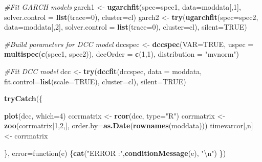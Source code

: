 \documentclass[]{elsarticle} %
\newenvironment{Shaded}{\begin{snugshade}}{\end{snugshade}}
\newcommand{\KeywordTok}[1]{\textcolor[rgb]{0.13,0.29,0.53}{\textbf{{#1}}}}
\newcommand{\DataTypeTok}[1]{\textcolor[rgb]{0.13,0.29,0.53}{{#1}}}
\newcommand{\DecValTok}[1]{\textcolor[rgb]{0.00,0.00,0.81}{{#1}}}
\newcommand{\CharTok}[1]{\textcolor[rgb]{0.31,0.60,0.02}{{#1}}}
\newcommand{\StringTok}[1]{\textcolor[rgb]{0.31,0.60,0.02}{{#1}}}
\newcommand{\CommentTok}[1]{\textcolor[rgb]{0.56,0.35,0.01}{\textit{{#1}}}}
\newcommand{\OtherTok}[1]{\textcolor[rgb]{0.56,0.35,0.01}{{#1}}}
\newcommand{\NormalTok}[1]{{#1}}
\begin{document}
\begin{Shaded}
\begin{Highlighting}[]
        \CommentTok{#Fit GARCH models}
        \NormalTok{garch1 <-}\StringTok{ }\KeywordTok{ugarchfit}\NormalTok{(}\DataTypeTok{spec=}\NormalTok{spec1, }\DataTypeTok{data=}\NormalTok{moddata[,}\DecValTok{1}\NormalTok{], }\DataTypeTok{solver.control =} \KeywordTok{list}\NormalTok{(}\DataTypeTok{trace=}\DecValTok{0}\NormalTok{), }
                            \DataTypeTok{cluster=}\NormalTok{cl)}
        \NormalTok{garch2 <-}\StringTok{ }\KeywordTok{try}\NormalTok{(}\KeywordTok{ugarchfit}\NormalTok{(}\DataTypeTok{spec=}\NormalTok{spec2, }\DataTypeTok{data=}\NormalTok{moddata[,}\DecValTok{2}\NormalTok{], }\DataTypeTok{solver.control =} \KeywordTok{list}\NormalTok{(}\DataTypeTok{trace=}\DecValTok{0}\NormalTok{), }
                                \DataTypeTok{cluster=}\NormalTok{cl), }\DataTypeTok{silent=}\OtherTok{TRUE}\NormalTok{)}

        \CommentTok{#Build parameters for DCC model }
        \NormalTok{dccspec <-}\StringTok{ }\KeywordTok{dccspec}\NormalTok{(}\DataTypeTok{VAR=}\OtherTok{TRUE}\NormalTok{, }\DataTypeTok{uspec =} \KeywordTok{multispec}\NormalTok{(}\KeywordTok{c}\NormalTok{(spec1, spec2)), }\DataTypeTok{dccOrder =} \KeywordTok{c}\NormalTok{(}\DecValTok{1}\NormalTok{,}\DecValTok{1}\NormalTok{), }
                           \DataTypeTok{distribution =} \StringTok{"mvnorm"}\NormalTok{)}

        \CommentTok{#Fit DCC model}
        \NormalTok{dcc <-}\StringTok{ }\KeywordTok{try}\NormalTok{(}\KeywordTok{dccfit}\NormalTok{(dccspec, }\DataTypeTok{data =} \NormalTok{moddata, }\DataTypeTok{fit.control=}\KeywordTok{list}\NormalTok{(}\DataTypeTok{scale=}\OtherTok{TRUE}\NormalTok{), }
                          \DataTypeTok{cluster=}\NormalTok{cl), }\DataTypeTok{silent=}\OtherTok{TRUE}\NormalTok{)}

        \KeywordTok{tryCatch}\NormalTok{(\{}

            \KeywordTok{plot}\NormalTok{(dcc, }\DataTypeTok{which=}\DecValTok{4}\NormalTok{)}
            \NormalTok{corrmatrix <-}\StringTok{ }\KeywordTok{rcor}\NormalTok{(dcc, }\DataTypeTok{type=}\StringTok{"R"}\NormalTok{)}
            \NormalTok{corrmatrix <-}\StringTok{ }\KeywordTok{zoo}\NormalTok{(corrmatrix[}\DecValTok{1}\NormalTok{,}\DecValTok{2}\NormalTok{,], }\DataTypeTok{order.by=}\KeywordTok{as.Date}\NormalTok{(}\KeywordTok{rownames}\NormalTok{(moddata)))}
            \NormalTok{timevarcor[,n] <-}\StringTok{ }\NormalTok{corrmatrix}

        \NormalTok{\}, }\DataTypeTok{error=}\NormalTok{function(e) \{}\KeywordTok{cat}\NormalTok{(}\StringTok{"ERROR :"}\NormalTok{,}\KeywordTok{conditionMessage}\NormalTok{(e), }\StringTok{"}\CharTok{\textbackslash{}n}\StringTok{"}\NormalTok{)}
        \NormalTok{\})}


\end{Highlighting}
\end{Shaded}
\end{document}
